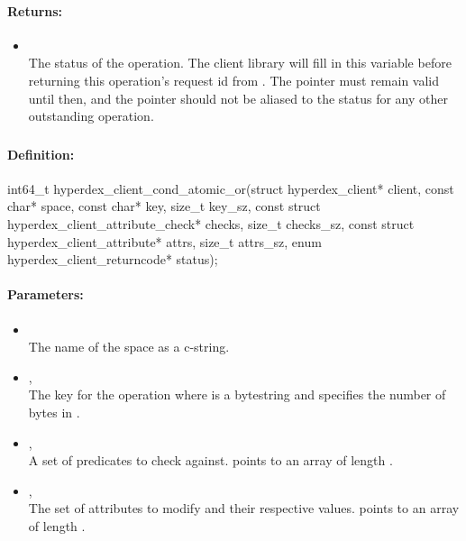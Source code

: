 \paragraph{Returns:}
\begin{itemize}[noitemsep]
\item {}\\
The status of the operation.  The client library will fill in this variable before returning this operation's request id from .  The pointer must remain valid until then, and the pointer should not be aliased to the status for any other outstanding operation.
\end{itemize}

\pagebreak
\subsubsection{}
\label{api:c:cond_atomic_or}


\paragraph{Definition:}
\begin{ccode}
int64_t hyperdex_client_cond_atomic_or(struct hyperdex_client* client,
        const char* space,
        const char* key, size_t key_sz,
        const struct hyperdex_client_attribute_check* checks, size_t checks_sz,
        const struct hyperdex_client_attribute* attrs, size_t attrs_sz,
        enum hyperdex_client_returncode* status);
\end{ccode}

\paragraph{Parameters:}
\begin{itemize}[noitemsep]
\item {}\\
The name of the space as a c-string.
\item {}, \\
The key for the operation where  is a bytestring and  specifies the number of bytes in .
\item {}, \\
A set of predicates to check against.   points to an array of length .
\item {}, \\
The set of attributes to modify and their respective values.   points to an array of length .
\end{itemize}

